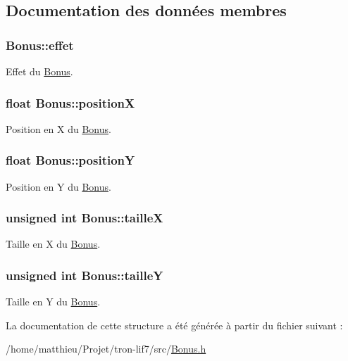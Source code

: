 \subsection{Documentation des données membres}
\hypertarget{structBonus_a0619fdbeba9edd702a607887a7f79f62}{
\subsubsection[{effet}]{ Bonus\-::effet}}\label{structBonus_a0619fdbeba9edd702a607887a7f79f62}
Effet du \hyperlink{structBonus}{Bonus}. \hypertarget{structBonus_a299226996e549498df83b3768d3b43af}{
\subsubsection[{position\-X}]{\setlength{\rightskip}{0pt plus 5cm}float Bonus\-::position\-X}}\label{structBonus_a299226996e549498df83b3768d3b43af}
Position en X du \hyperlink{structBonus}{Bonus}. \hypertarget{structBonus_aa5cc7fbc0c3fe6b014900c7223a1d6cb}{
\subsubsection[{position\-Y}]{\setlength{\rightskip}{0pt plus 5cm}float Bonus\-::position\-Y}}\label{structBonus_aa5cc7fbc0c3fe6b014900c7223a1d6cb}
Position en Y du \hyperlink{structBonus}{Bonus}. \hypertarget{structBonus_aede925340da983fdddf1f901c976e00a}{
\subsubsection[{taille\-X}]{\setlength{\rightskip}{0pt plus 5cm}unsigned int Bonus\-::taille\-X}}\label{structBonus_aede925340da983fdddf1f901c976e00a}
Taille en X du \hyperlink{structBonus}{Bonus}. \hypertarget{structBonus_ae570700aa309f6de2f91fc84ddb409c2}{
\subsubsection[{taille\-Y}]{\setlength{\rightskip}{0pt plus 5cm}unsigned int Bonus\-::taille\-Y}}\label{structBonus_ae570700aa309f6de2f91fc84ddb409c2}
Taille en Y du \hyperlink{structBonus}{Bonus}. 

La documentation de cette structure a été générée à partir du fichier suivant \-:\begin{DoxyCompactItemize}
\item 
/home/matthieu/\-Projet/tron-\/lif7/src/\hyperlink{Bonus_8h}{Bonus.\-h}\end{DoxyCompactItemize}
